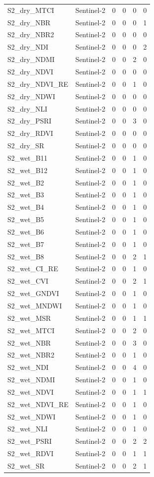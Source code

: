 \begin{tabular}{llrrrr}
S2_dry_MTCI & Sentinel-2 & 0 & 0 & 0 & 0 \\
S2_dry_NBR & Sentinel-2 & 0 & 0 & 0 & 1 \\
S2_dry_NBR2 & Sentinel-2 & 0 & 0 & 0 & 0 \\
S2_dry_NDI & Sentinel-2 & 0 & 0 & 0 & 2 \\
S2_dry_NDMI & Sentinel-2 & 0 & 0 & 2 & 0 \\
S2_dry_NDVI & Sentinel-2 & 0 & 0 & 0 & 0 \\
S2_dry_NDVI_RE & Sentinel-2 & 0 & 0 & 1 & 0 \\
S2_dry_NDWI & Sentinel-2 & 0 & 0 & 0 & 0 \\
S2_dry_NLI & Sentinel-2 & 0 & 0 & 0 & 0 \\
S2_dry_PSRI & Sentinel-2 & 0 & 0 & 3 & 0 \\
S2_dry_RDVI & Sentinel-2 & 0 & 0 & 0 & 0 \\
S2_dry_SR & Sentinel-2 & 0 & 0 & 0 & 0 \\
S2_wet_B11 & Sentinel-2 & 0 & 0 & 1 & 0 \\
S2_wet_B12 & Sentinel-2 & 0 & 0 & 1 & 0 \\
S2_wet_B2 & Sentinel-2 & 0 & 0 & 1 & 0 \\
S2_wet_B3 & Sentinel-2 & 0 & 0 & 1 & 0 \\
S2_wet_B4 & Sentinel-2 & 0 & 0 & 1 & 0 \\
S2_wet_B5 & Sentinel-2 & 0 & 0 & 1 & 0 \\
S2_wet_B6 & Sentinel-2 & 0 & 0 & 1 & 0 \\
S2_wet_B7 & Sentinel-2 & 0 & 0 & 1 & 0 \\
S2_wet_B8 & Sentinel-2 & 0 & 0 & 2 & 1 \\
S2_wet_CI_RE & Sentinel-2 & 0 & 0 & 1 & 0 \\
S2_wet_CVI & Sentinel-2 & 0 & 0 & 2 & 1 \\
S2_wet_GNDVI & Sentinel-2 & 0 & 0 & 1 & 0 \\
S2_wet_MNDWI & Sentinel-2 & 0 & 0 & 1 & 0 \\
S2_wet_MSR & Sentinel-2 & 0 & 0 & 1 & 1 \\
S2_wet_MTCI & Sentinel-2 & 0 & 0 & 2 & 0 \\
S2_wet_NBR & Sentinel-2 & 0 & 0 & 3 & 0 \\
S2_wet_NBR2 & Sentinel-2 & 0 & 0 & 1 & 0 \\
S2_wet_NDI & Sentinel-2 & 0 & 0 & 4 & 0 \\
S2_wet_NDMI & Sentinel-2 & 0 & 0 & 1 & 0 \\
S2_wet_NDVI & Sentinel-2 & 0 & 0 & 1 & 1 \\
S2_wet_NDVI_RE & Sentinel-2 & 0 & 0 & 1 & 0 \\
S2_wet_NDWI & Sentinel-2 & 0 & 0 & 1 & 0 \\
S2_wet_NLI & Sentinel-2 & 0 & 0 & 1 & 0 \\
S2_wet_PSRI & Sentinel-2 & 0 & 0 & 2 & 2 \\
S2_wet_RDVI & Sentinel-2 & 0 & 0 & 1 & 1 \\
S2_wet_SR & Sentinel-2 & 0 & 0 & 2 & 1 \\
\bottomrule
\end{tabular}
